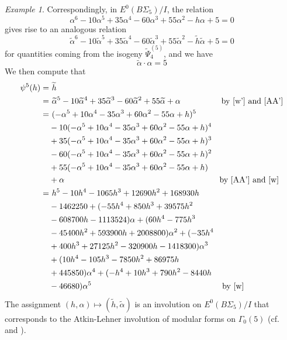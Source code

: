 \documentclass{gtpart}
\theoremstyle{definition}
\theoremstyle{remark}
\newtheorem{ex}[thm]{Example}
\newcommand{\A}{\alpha}
\newcommand{\G}{\Gamma}
\renewcommand{\=}{\approx}
\renewcommand{\-}{\sim}
\numberwithin{equation}{section}
\numberwithin{thm}{section}
\begin{document}
\begin{ex}
 Correspondingly, in $E^0(B\Sigma_5) / I$, the relation 
 \begin{equation}
  \label{w}
  \A^6 - 10 \A^5 + 35 \A^4 - 60 \A^3 + 55 \A^2 - h \A + 5 = 0 
 \end{equation}
 gives rise to an analogous relation  
 \begin{equation}
  \label{w'}
  \widetilde{\A}^6 - 10 \widetilde{\A}^5 + 35 \widetilde{\A}^4 - 60 \widetilde{\A}^3 + 55 \widetilde{\A}^2 - \widetilde{h} \widetilde{\A} + 5 = 0 
 \end{equation}
 for quantities coming from the isogeny $\widetilde{\Psi}_4^{(5)}$, and we have 
 \begin{equation}
  \label{AA'}
  \widetilde{\A} \cdot \A = 5 
 \end{equation}
 We then compute that 
 \begin{equation}
  \label{psi5}
  \begin{split}
   \psi^5(h) = & ~ \widetilde{h} \\
             = & ~ \widetilde{\A}^5 - 10 \widetilde{\A}^4 + 35 \widetilde{\A}^3 - 60 \widetilde{\A}^2 + 55 \widetilde{\A} + \A \qquad\qquad\quad \text{by \eqref{w'} and \eqref{AA'}} \\
             = & ~ (-\A^5 + 10 \A^4 - 35 \A^3 + 60 \A^2 - 55 \A + h)^5 \\
               & - 10 (-\A^5 + 10 \A^4 - 35 \A^3 + 60 \A^2 - 55 \A + h)^4 \\
               & + 35 (-\A^5 + 10 \A^4 - 35 \A^3 + 60 \A^2 - 55 \A + h)^3 \\
               & - 60 (-\A^5 + 10 \A^4 - 35 \A^3 + 60 \A^2 - 55 \A + h)^2 \\
               & + 55 (-\A^5 + 10 \A^4 - 35 \A^3 + 60 \A^2 - 55 \A + h) \\
               & + \A \qquad\qquad\qquad\qquad\qquad\qquad\qquad\qquad\qquad\quad \text{by \eqref{AA'} and \eqref{w}} \\
             = & ~ h^5 - 10 h^4 - 1065 h^3 + 12690 h^2 + 168930 h \\
               & - 1462250 + (-55 h^4 + 850 h^3 + 39575 h^2 \\
               & - 608700 h - 1113524) \A + (60 h^4 - 775 h^3 \\
               & - 45400 h^2 + 593900 h + 2008800) \A^2 + (-35 h^4 \\
               & + 400 h^3 + 27125 h^2 - 320900 h - 1418300) \A^3 \\
               & + (10 h^4 - 105 h^3 - 7850 h^2 + 86975 h \\
               & + 445850) \A^4 + (-h^4 + 10 h^3 + 790 h^2 - 8440 h \\
               & - 46680) \A^5 \qquad\qquad\qquad\qquad\qquad\qquad\qquad\quad~~~ \text{by \eqref{w}} 
  \end{split}
 \end{equation}
 The assignment $(h, \A) \mapsto (\widetilde{h}, \widetilde{\A})$ is an involution on $E^0(B\Sigma_5) / I$ 
 that corresponds to the Atkin-Lehner involution of modular forms on $\G_0(5)$ (cf.~\cite[Lemmas 7--10]{AtkinLehner} and \cite[11.3.1]{KM}).  
\end{ex}
\end{document}

